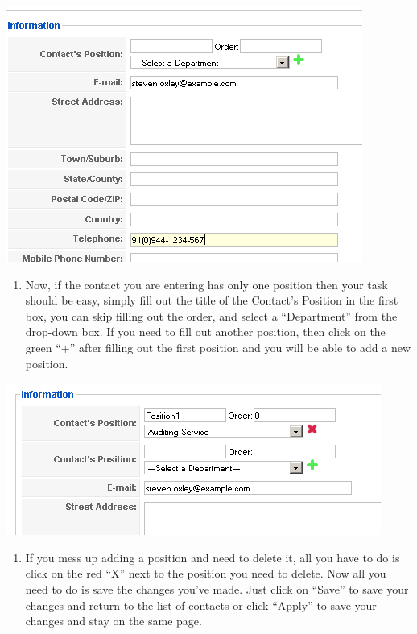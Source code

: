 \documentclass[letterpaper,10pt,english]{manual}
\begin{document}
{\hfill\includegraphics{directoryContactsNewContactInformation1.png}\hfill}
\begin{enumerate}
\item {} 
Now, if the contact you are entering has only one position then your task should be easy, simply fill out the title of the Contact's Position in the first box, you can skip filling out the order, and select a “Department” from the drop-down box.  If you need to fill out another position, then click on the green “+” after filling out the first position and you will be able to add a new position.

\end{enumerate}

{\hfill\includegraphics{directoryContactsNewContactPosition1.png}\hfill}
\begin{enumerate}
\item {} 
If you mess up adding a position and need to delete it, all you have to do is click on the red “X” next to the position you need to delete.  Now all you need to do is save the changes you've made.  Just click on “Save” to save your changes and return to the list of contacts or click “Apply” to save your changes and stay on the same page.

\end{enumerate}
\end{document}
